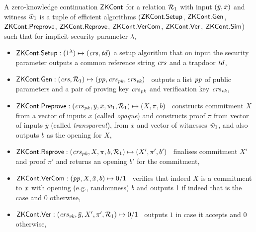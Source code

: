 \begin{definition}[ZK Continuations]
\label{def:zk_cont}
 A zero-knowledge continuation ${\mathsf{ZKCont}}$ for a relation $\mathcal{R}_1$ with 
input $(\bar{y}, \bar{x})$ and witness $\bar{w}_1$ is a tuple of efficient algorithms 
(${\mathsf{ZKCont}}.{\mathsf{Setup}}$, ${\mathsf{ZKCont}}.\mathsf{Gen}$, ${\mathsf{ZKCont}}.{\mathsf{Preprove}}$, ${\mathsf{ZKCont}}.{\mathsf{Reprove}}$, ${\mathsf{ZKCont}}.{\mathsf{VerCom}}$, ${\mathsf{ZKCont}}.{\mathsf{Ver}}$, ${\mathsf{ZKCont}}.{\mathsf{Sim}}$) 
such that for implicit security parameter $\lambda$,
\begin{itemize}

\item ${\mathsf{ZKCont}}.{\mathsf{Setup}}: (1^{\lambda}) \mapsto (\mathit{crs}, \mathit{td})$ a setup algorithm that on input the security parameter 
outputs a common reference string $\mathit{crs}$ and a trapdoor $\mathit{td}$,

\item ${\mathsf{ZKCont}}.\mathsf{Gen}: (\mathit{crs}, \mathcal{R}_1) \mapsto (\mathit{pp}, \mathit{crs}_{\mathit{pk}}, \mathit{crs}_{\mathit{vk}})$ \, 
outputs a list $\mathit{pp}$ of public parameters and a pair of proving key $\mathit{crs}_{\mathit{pk}}$ and verification key $\mathit{crs}_{\mathit{vk}}$, 

\item ${\mathsf{ZKCont}}.{\mathsf{Preprove}}: (\mathit{crs}_{\mathit{pk}}, \bar{y}, \bar{x}, \bar{w}_1, \mathcal{R}_1) \mapsto (X, \pi, b)$ \,
constructs commitment $X$ from a vector of inputs $\bar{x}$ (called \emph{opaque}) and 
constructs proof $\pi$ from vector of inputs 
$\bar{y}$ (called \emph{transparent}), from $\bar{x}$ and vector of witnesses $\bar{w}_1$, and 
also outputs $b$ as the opening for $X$,

\item ${\mathsf{ZKCont}}.{\mathsf{Reprove}}: (\mathit{crs}_{\mathit{pk}}, X, \pi, b, \mathcal{R}_1) \mapsto (X', \pi', b')$ \,
finalises commitment $X'$ and proof $\pi'$ and returns an opening $b'$ for the commitment, 

\item ${\mathsf{ZKCont}}.{\mathsf{VerCom}}: (\mathit{pp}, X, \bar{x}, b) \mapsto 0/1$ \, 
verifies that indeed $X$ is a commitment to $\bar{x}$ with opening (e.g., randomness) $b$ and 
outputs 1 if indeed that is the case and 0 otherwise,
 
\item ${\mathsf{ZKCont}}.{\mathsf{Ver}}: (\mathit{crs}_{\mathit{vk}}, \bar{y}, X', \pi', \mathcal{R}_1) \mapsto 0/1$ \, outputs $1$ in case it accepts and $0$ otherwise,


\end{itemize}
\end{definition}
